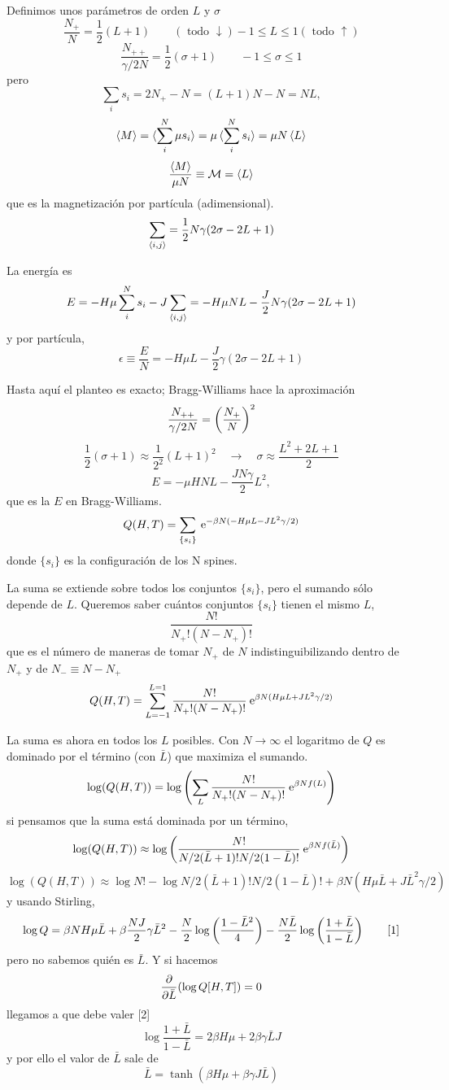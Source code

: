 \documentclass[10pt,oneside]{CBFT_book}
\begin{document}
Definimos unos parámetros de orden $L$ y $\sigma$
\[
	\frac{N_+}{N} = \frac{1}{2}(L+1) \qquad (\text{ todo } \downarrow) -1 \leq L \leq 1 (\text{ todo } \uparrow)
\]
\[
	\frac{N_{++}}{\gamma/2 N} = \frac{1}{2}(\sigma + 1) \qquad -1 \leq \sigma \leq 1
\]
pero 
\[
	\sum_i s_i = 2N_+ - N = (L+1)N - N = NL,
\]
\[
	\braket{M} = \braket{ \sum_i^N \mu s_i } = \mu \braket{ \sum_i^N s_i } = \mu N \braket{L} 
\]
\[
	\frac{\braket{M}}{\mu N} \equiv \mathcal{M} = \braket{L}
\]
que es la magnetización por partícula (adimensional).
\[
	\sum_{\braket{i,j}} = \frac{1}{2} N \gamma (2\sigma - 2L + 1) 
\]

La energía es 
\[
	E = - H \mu \sum_i^N s_i - J \sum_{\braket{i,j}} =
	-H\mu NL - \frac{J}{2} N \gamma (2\sigma - 2L + 1) 
\]
y por partícula,
\[
	\epsilon \equiv \frac{E}{N} = -H\mu L - \frac{J}{2} \gamma (2\sigma - 2L + 1) 
\]

Hasta aquí el planteo es exacto; Bragg-Williams hace la aproximación
\[
	\frac{N_{++}}{\gamma/2 N}= \left( \frac{ N_+ }{ N } \right)^2
\]
\[
	\frac{1}{2}(\sigma + 1) \approx \frac{1}{2^2} (L+1)^2 \quad \rightarrow \quad 
	\sigma \approx \frac{L^2 + 2L + 1}{2}
\]
\[ 
	\boxed{ E = -\mu H N L - \frac{JN\gamma }{2}L^2 },
\]
que es la $E$ en Bragg-Williams.
\[
	Q(H,T) = \sum_{\{ s_i\}} \:\mathrm{e}^{-\beta N(- H\mu L - JL^2 \gamma / 2) }
\]
donde $\{ s_i\}$ es la configuración de los N spines.

La suma se extiende sobre todos los conjuntos $\{ s_i\}$, pero el sumando sólo depende de $L$.
Queremos saber cuántos conjuntos $\{ s_i\}$ tienen el mismo $L$,
\[
	\frac{N!}{N_+!(N-N_+)!}
\]
que es el número de maneras de tomar $N_+$ de $N$ indistinguibilizando dentro de $N_+$ y de $N_-\equiv
N-N_+$
\[
	Q(H,T) = \sum_{L=-1}^{L=1} \frac{N!}{N_+!(N-N_+)!}
	\:\mathrm{e}^{\beta N( H\mu L + JL^2 \gamma / 2) }
\]

La suma es ahora en todos los $L$ posibles. Con $N\to\infty$ el logaritmo de $Q$ es dominado por el término
(con $\bar{L}$) que maximiza el sumando.
\[
	\log (Q(H,T)) = \log \left( \sum_L \frac{N!}{N_+!(N-N_+)!} \:\mathrm{e}^{\beta N f(L)} \right)
\]
si pensamos que la suma está dominada por un término,
\[
	\log (Q(H,T)) \approx \log \left( \frac{N!}{ N/2(\bar{L}+1)!N/2(1-\bar{L})!} 
	\:\mathrm{e}^{\beta N f(\bar{L})} \right)
\]
\[
	\log (Q(H,T)) \approx \log N! - \log N/2(\bar{L}+1)!N/2(1-\bar{L})! + 
	\beta N ( H\mu \bar{L} + J\bar{L}^2 \gamma/2 ) 
\]
y usando Stirling,
\[
	\log Q = \beta N H \mu \bar{L} + \beta \frac{NJ}{2} \gamma \bar{L}^2 -
	\frac{N}{2} \log \left( \frac{ 1-\bar{L}^2 }{ 4 } \right) - \frac{N\bar{L}}{2} \log \left( \frac{ 1+\bar{L} }{ 1-\bar{L} } \right)
	\qquad [1]
\]
pero no sabemos quién es $\bar{L}$. Y si hacemos
\[
	\frac{\partial^{\hspace{-0.05em}} {}}{\partial {\bar{L}}^{\hspace{-0.05em}}}( \log Q[H,T] ) = 0
\]
llegamos a que debe valer [2]
\[
	\log \frac{1+\bar{L}}{1-\bar{L}} = 2\beta H\mu + 2\beta \gamma \bar{L} J
\]
y por ello el valor de $\bar{L}$ sale de
\[
	\bar{L} = \tanh( \beta H \mu + \beta \gamma J \bar{L} )
\]
\end{document}
